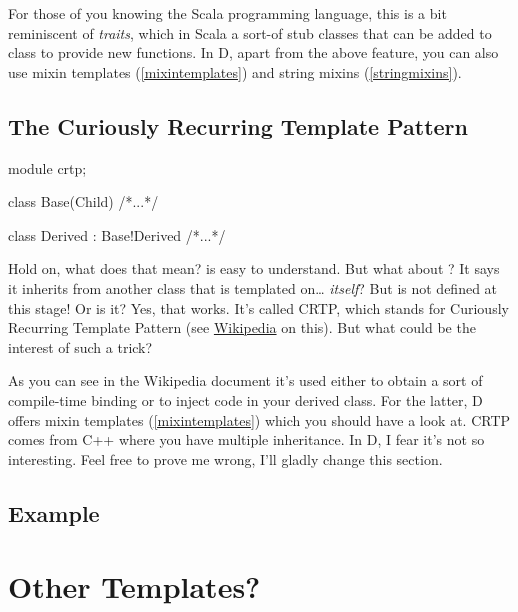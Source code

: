 For those of you knowing the Scala programming language, this is a bit reminiscent of \emph{traits}, which in Scala a sort-of stub classes that can be added to class to provide new functions. In D, apart from the above feature, you can also use mixin templates (\ref{mixintemplates}) and string mixins (\ref{stringmixins}).


\subsection{The Curiously Recurring Template Pattern}

\begin{dcode}
module crtp;

class Base(Child) { /*...*/ }

class Derived : Base!Derived { /*...*/ }
\end{dcode}

Hold on, what does that mean?  is easy to understand. But what about ? It says it inherits from another class that is templated on\ldots {} \emph{itself}? But  is not defined at this stage! Or is it? 
Yes, that works. It's called CRTP, which stands for Curiously Recurring Template Pattern (see \href{ http://en.wikipedia.org/wiki/Curiously_recurring_template_pattern}{Wikipedia} on this). But what could be the interest of such a trick?

As you can see in the Wikipedia document it's used either to obtain a sort of compile-time binding or to inject code in your derived class. For the latter, D offers mixin templates (\ref{mixintemplates}) which you should have a look at. CRTP comes from C++ where you have multiple inheritance. In D, I fear it's not so interesting. Feel free to prove me wrong, I'll gladly change this section.

\subsection{Example}



\section{Other Templates?}\label{othertemplates}

